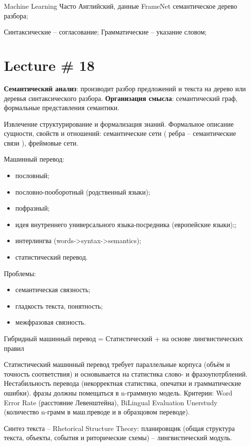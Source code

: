 \documentclass[a4paper]{article}
\newcommand{\eng}[1]{\foreignlanguage{english}{#1}}
\begin{document}
\eng{Machine Learning}
Часто Английский, данные FrameNet семантическое дерево разбора;

Синтаксические -- согласование;
Грамматические -- указание словом;

\section{Lecture \# 18} %
\label{sec:lecture_18}

\textbf{Семантический анализ}: производит разбор предложений и текста на дерево или деревья синтаксического разбора. \textbf{Организация смысла}: семантический граф, формальные представления семантики.

Извлечение структурирование и формализация знаний. Формальное описание сущности, свойств и отношений: семантические сети ( ребра -- семантические связи  ), фреймовые сети.

Машинный перевод: \begin{itemize}
	\item пословный;
	\item пословно-пооборотный (родственный языки);
	\item пофразный;
	\item идея внутреннего универсального языка-посредника (европейские языки);;
	\item интерлингва (words->syntax->semantics);
	\item статистический перевод.
\end{itemize}

Проблемы: \begin{itemize}
	\item семантическая связность;
	\item гладкость текста, понятность;
	\item межфразовая связность.
\end{itemize}

Гибридный машинный перевод = Статистический + на основе лингвистических правил

Статистический машинный перевод требует параллельные корпуса (объём и точность соответствия) и основывается на статистика слово- и фразоупотрблений.
Нестабильность перевода (некорректная статистика, опечатки и грамматические ошибки).
фразы должны помещаться в n-граммную модель.
Критерии: Word Error Rate (расстояние Левенштейна), BiLingual Evaluation Unerstudy (количество n-грамм в маш.преводе и в образцовом переводе).

Синтез текста -- Rhetorical Structure Theory: планировщик (общая структура текста, объекты, события и риторические схемы) -- лингвистический модуль.
\end{document}
